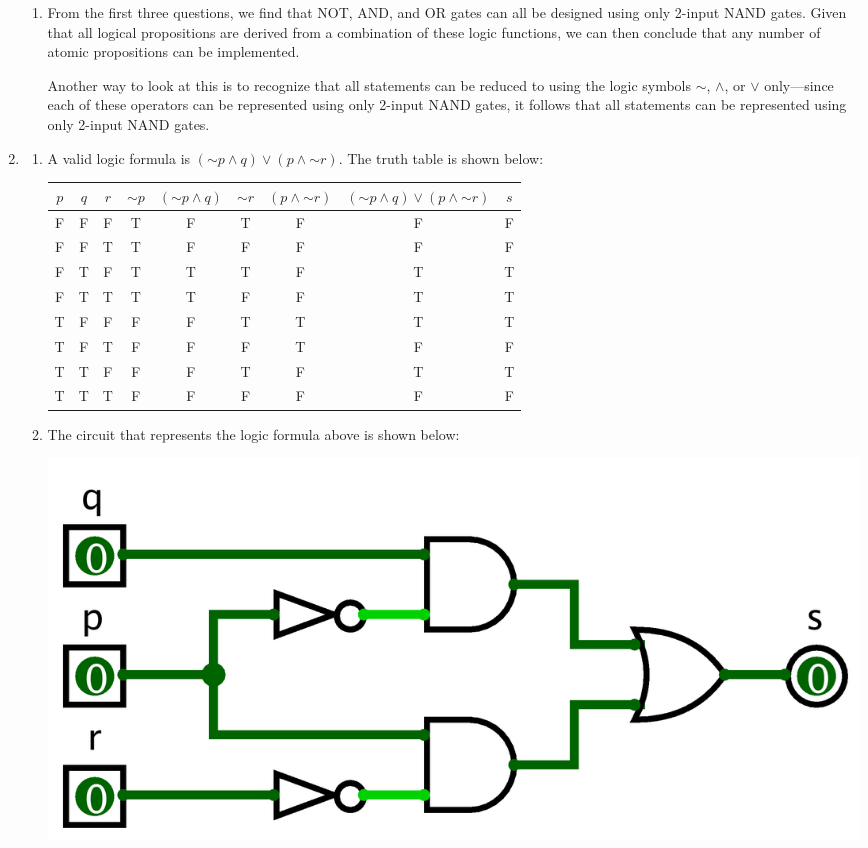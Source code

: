 \documentclass[11pt, notitlepage]{article}
\newcommand*{\oldneg}{\mathord{\sim}}
\begin{document}
\begin{enumerate}
\begin{enumerate}
\item From the first three questions, we find that NOT, AND, and OR gates can all be designed using only 2-input NAND gates. Given that all logical propositions are derived from a combination of these logic functions, we can then conclude that any number of atomic propositions can be implemented.

Another way to look at this is to recognize that all statements can be reduced to using the logic symbols $\sim$, $\wedge$, or $\vee$ only---since each of these operators can be represented using only 2-input NAND gates, it follows that all statements can be represented using only 2-input NAND gates.

\end{enumerate}

\item \begin{enumerate}

\item A valid logic formula is $(\oldneg p \wedge q) \vee (p \wedge\oldneg r)$. The truth table is shown below:
\begin{center}
\begin{tabular}{|ccc||cccc|c|c|}
	\toprule
	$p$ & $q$ & $r$ & $\oldneg p$ & $(\oldneg p \wedge q)$ & $\oldneg r$ & $(p \wedge \oldneg r)$ & $(\oldneg p \wedge q) \vee (p \wedge \oldneg r)$ & $s$\\
	\midrule
	F & F & F & T & F & T & F & F & F\\
	F & F & T & T & F & F & F & F & F\\
	F & T & F & T & T & T & F & T & T\\
	F & T & T & T & T & F & F & T & T\\
	T & F & F & F & F & T & T & T & T\\
	T & F & T & F & F & F & T & F & F\\
	T & T & F & F & F & T & F & T & T\\
	T & T & T & F & F& F  & F & F & F\\
	\bottomrule
\end{tabular}
\end{center}

\item The circuit that represents the logic formula above is shown below:
\begin{center}
\includegraphics[scale=0.1]{2b}
\end{center}
\end{enumerate}


\end{enumerate}
\end{document}
